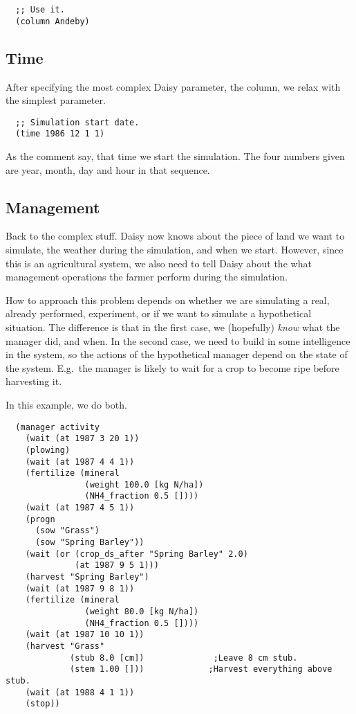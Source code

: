 \documentclass[a4paper]{article}
\begin{document}
\begin{verbatim}
  ;; Use it.
  (column Andeby)
\end{verbatim}

\subsection{Time}

After specifying the most complex Daisy parameter, the column, we
relax with the simplest parameter.

\begin{verbatim}
  ;; Simulation start date.
  (time 1986 12 1 1)
\end{verbatim}

As the comment say, that time we start the simulation.  The four
numbers given are year, month, day and hour in that sequence.

\subsection{Management}
\label{sec:ex-man}

Back to the complex stuff.  Daisy now knows about the piece of land
we want to simulate, the weather during the simulation, and when we
start.  However, since this is an agricultural system, we also need to
tell Daisy about the what management operations the farmer perform
during the simulation.

How to approach this problem depends on whether we are simulating a
real, already performed, experiment, or if we want to simulate a
hypothetical situation.  The difference is that in the first case, we
(hopefully) \emph{know} what the manager did, and when.  In the second
case, we need to build in some intelligence in the system, so the
actions of the hypothetical manager depend on the state of the system.
E.g.\ the manager is likely to wait for a crop to become ripe before
harvesting it.

In this example, we do both.

\begin{verbatim}
  (manager activity
    (wait (at 1987 3 20 1))
    (plowing)
    (wait (at 1987 4 4 1))
    (fertilize (mineral
                (weight 100.0 [kg N/ha])
                (NH4_fraction 0.5 [])))
    (wait (at 1987 4 5 1))
    (progn
      (sow "Grass")
      (sow "Spring Barley"))
    (wait (or (crop_ds_after "Spring Barley" 2.0)
              (at 1987 9 5 1)))
    (harvest "Spring Barley")
    (wait (at 1987 9 8 1))
    (fertilize (mineral
                (weight 80.0 [kg N/ha])
                (NH4_fraction 0.5 [])))
    (wait (at 1987 10 10 1))
    (harvest "Grass"
             (stub 8.0 [cm])              ;Leave 8 cm stub.
             (stem 1.00 []))             ;Harvest everything above stub.
    (wait (at 1988 4 1 1))
    (stop))
\end{verbatim}
\end{document}
